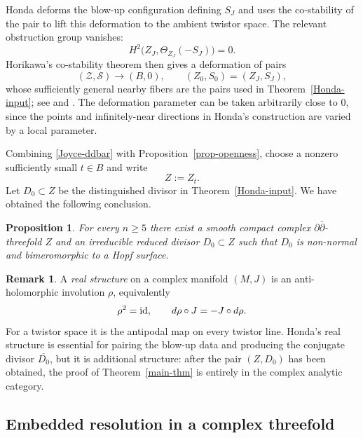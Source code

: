 \documentclass[11pt]{amsart}
\numberwithin{equation}{section}
\def\mc{\mathcal}
\def\id{{\rm id}}
\theoremstyle{plain}
\newtheorem{prop}[thm]{Proposition}
\theoremstyle{definition}
\newtheorem{rem}[thm]{Remark}
\begin{document}
Honda deforms the blow-up configuration defining $S_J$ and uses the
co-stability of the pair to lift this deformation to the ambient twistor
space.  The relevant obstruction group vanishes:
\begin{equation*}%
 H^2\bigl(Z_J,\Theta_{Z_J}(-S_J)\bigr)=0.
\end{equation*}
Horikawa's co-stability theorem then gives a deformation of pairs
\begin{equation*}%
 (\mc Z,\mc S)\longrightarrow(B,0),
 \qquad (Z_0,S_0)=(Z_J,S_J),
\end{equation*}
whose sufficiently general nearby fibers are the pairs used in
Theorem~\ref{Honda-input}; see \cite[\S~5.1 and Remark 5.1]{Hn15} and
\cite[Theorem 8.3]{Hr76}.
The deformation parameter can be taken arbitrarily close to $0$, since the
points and infinitely-near directions in Honda's construction are varied by
a local parameter.

Combining \eqref{Joyce-ddbar} with Proposition~\ref{prop-openness}, choose a
nonzero sufficiently small $t\in B$ and write
\begin{equation*}%
 Z:=Z_t.
\end{equation*}
Let $D_0\subset Z$ be the distinguished divisor in
Theorem~\ref{Honda-input}.
We have obtained the following conclusion.

\begin{prop}\label{Honda-ddbar-pair}
For every $n\geq5$ there exist a smooth compact complex
$\partial\bar\partial$-threefold $Z$ and an irreducible reduced divisor
$D_0\subset Z$ such that $D_0$ is non-normal and bimeromorphic to a Hopf surface.
\end{prop}

\begin{rem}\label{real-structure-remark}
A \emph{real structure} on a complex manifold $(M,J)$ is an anti-holomorphic
involution $\rho$, equivalently
\[
 \rho^2=\id,\qquad d\rho\circ J=-J\circ d\rho.
\]
For a twistor space it is the antipodal map on every twistor line.  Honda's
real structure is essential for pairing the blow-up data and producing the
conjugate divisor $\overline{D_0}$, but it is additional structure: after the pair
$(Z,D_0)$ has been obtained, the proof of Theorem~\ref{main-thm} is entirely in
the complex analytic category.
\end{rem}
\subsection{Embedded resolution in a complex threefold}
\label{resolution-section}
\end{document}
